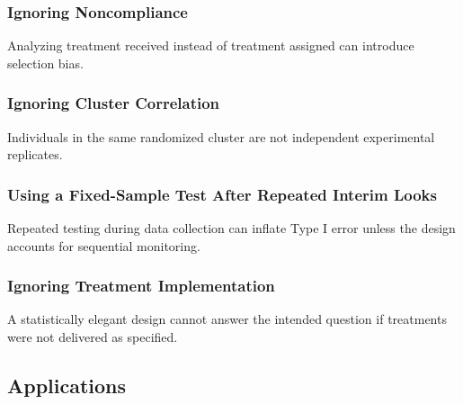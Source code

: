 \subsubsection{Ignoring Noncompliance}

Analyzing treatment received instead of treatment assigned can introduce
selection bias.

\subsubsection{Ignoring Cluster Correlation}

Individuals in the same randomized cluster are not independent
experimental replicates.

\subsubsection{Using a Fixed-Sample Test After Repeated Interim Looks}

Repeated testing during data collection can inflate Type I error unless
the design accounts for sequential monitoring.

\subsubsection{Ignoring Treatment Implementation}

A statistically elegant design cannot answer the intended question if
treatments were not delivered as specified.

\subsection{Applications}
\label{subsec:experimental-design-applications}

